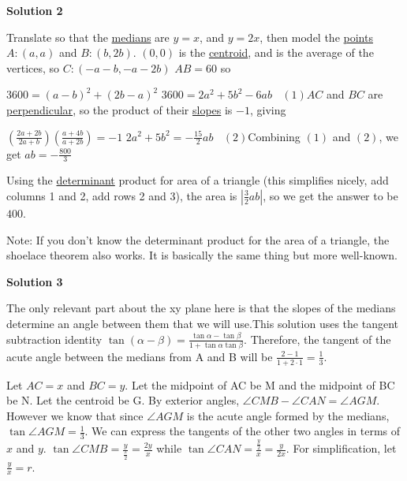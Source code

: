 \begin{enumerate}
 



\textbf{Solution 2}

Translate so that the \href{https://artofproblemsolving.com/wiki/index.php?title=Median}{medians} are $y = x$, and $y = 2x$, then model the \href{https://artofproblemsolving.com/wiki/index.php?title=Point}{points} $A: (a,a)$ and $B: (b,2b)$. $(0,0)$ is the \href{https://artofproblemsolving.com/wiki/index.php?title=Centroid}{centroid}, and is the average of the vertices, so $C: (- a - b, - a - 2b)$
$AB = 60$ so 

 $3600 = (a - b)^2 + (2b - a)^2$
$3600 = 2a^2 + 5b^2 - 6ab \ \ \ \ (1)$$AC$ and $BC$ are \href{https://artofproblemsolving.com/wiki/index.php?title=Perpendicular}{perpendicular}, so the product of their \href{https://artofproblemsolving.com/wiki/index.php?title=Slope}{slopes} is $-1$, giving

 $\left(\frac {2a + 2b}{2a + b}\right)\left(\frac {a + 4b}{a + 2b}\right) = - 1$
$2a^2 + 5b^2 = - \frac {15}{2}ab \ \ \ \  (2)$Combining $(1)$ and $(2)$, we get $ab = - \frac {800}{3}$

 Using the \href{https://artofproblemsolving.com/wiki/index.php?title=Determinant}{determinant} product for area of a triangle (this simplifies nicely, add columns 1 and 2, add rows 2 and 3), the area is $\left|\frac {3}{2}ab\right|$, so we get the answer to be $400$.

 
Note: If you don't know the determinant product for the area of a triangle, the shoelace theorem also works. It is basically the same thing but more well-known.

 



\textbf{Solution 3}

The only relevant part about the xy plane here is that the slopes of the medians determine an angle between them that we will use.This solution uses the tangent subtraction identity $\tan(\alpha -\beta)=\frac{\tan\alpha -\tan\beta}{1+\tan\alpha \tan\beta}$. Therefore, the tangent of the acute angle between the medians from A and B will be $\frac{2-1}{1+2 \cdot 1}= \frac{1}{3}$.

 Let $AC =x$ and $BC =y$. Let the midpoint of AC be M and the midpoint of BC be N. Let the centroid be G. By exterior angles, $\angle CMB - \angle CAN = \angle AGM$. However we know that since $\angle AGM$ is the acute angle formed by the medians, $\tan \angle AGM=\frac{1}{3}$. We can express the tangents of the other two angles in terms of $x$ and $y$. $\tan \angle CMB= \frac{y}{\frac{x}{2}}=\frac{2y}{x}$ while $\tan \angle CAN= \frac{\frac{y}{2}}{x}=\frac{y}{2x}$. For simplification, let $\frac{y}{x}=r$.


\end{enumerate}
